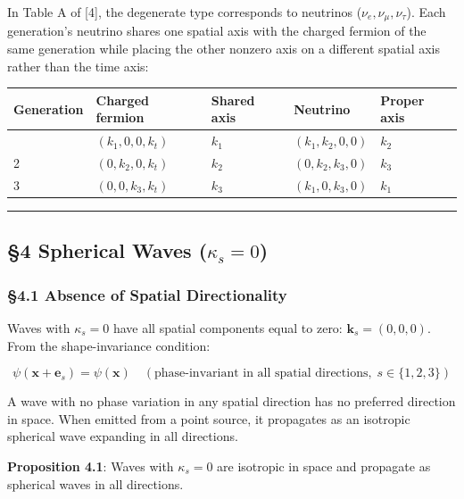 \documentclass[
  a4paper,11pt]{article}
\newcounter{none}
\theoremstyle{definition}
\theoremstyle{remark}
\begin{document}
In Table A of {[}4{]}, the degenerate type corresponds to neutrinos
(\(\nu_e, \nu_\mu, \nu_\tau\)). Each generation's neutrino shares one
spatial axis with the charged fermion of the same generation while
placing the other nonzero axis on a different spatial axis rather than
the time axis:

{\def\LTcaptype{none} %
\begin{longtable}[]{@{}lllll@{}}
\toprule\noalign{}
Generation & Charged fermion & Shared axis & Neutrino & Proper axis \\
\midrule\noalign{}
\endhead
\bottomrule\noalign{}
\endlastfoot
1 & \((k_1, 0, 0, k_t)\) & \(k_1\) & \((k_1, k_2, 0, 0)\) & \(k_2\) \\
2 & \((0, k_2, 0, k_t)\) & \(k_2\) & \((0, k_2, k_3, 0)\) & \(k_3\) \\
3 & \((0, 0, k_3, k_t)\) & \(k_3\) & \((k_1, 0, k_3, 0)\) & \(k_1\) \\
\end{longtable}
}

\begin{center}\rule{0.5\linewidth}{0.5pt}\end{center}

\subsection{\texorpdfstring{§4 Spherical Waves
(\(\kappa_s = 0\))}{§4 Spherical Waves (\textbackslash kappa\_s = 0)}}\label{spherical-waves-kappa_s-0}

\subsubsection{§4.1 Absence of Spatial
Directionality}\label{absence-of-spatial-directionality}

Waves with \(\kappa_s = 0\) have all spatial components equal to zero:
\(\mathbf{k}_s = (0, 0, 0)\). From the shape-invariance condition:

\[\psi(\mathbf{x} + \mathbf{e}_s) = \psi(\mathbf{x}) \quad (\text{phase-invariant in all spatial directions},\; s \in \{1, 2, 3\})\]

A wave with no phase variation in any spatial direction has no preferred
direction in space. When emitted from a point source, it propagates as
an isotropic spherical wave expanding in all directions.

\textbf{Proposition 4.1}: Waves with \(\kappa_s = 0\) are isotropic in
space and propagate as spherical waves in all directions.
\end{document}
